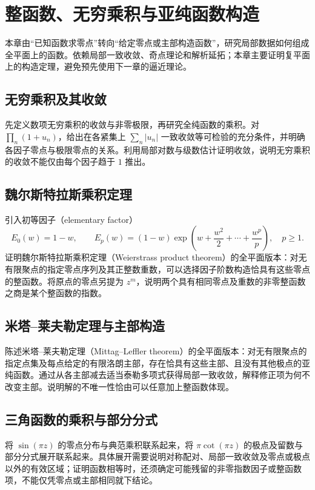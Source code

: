 \documentclass[UTF8,12pt,a4paper,fontset=fandol]{ctexbook}
\begin{document}
\chapter{整函数、无穷乘积与亚纯函数构造}
\label{chap:ca-entire}

本章由“已知函数求零点”转向“给定零点或主部构造函数”，研究局部数据如何组成全平面上的函数。依赖局部一致收敛、奇点理论和解析延拓；本章主要证明复平面上的构造定理，避免预先使用下一章的逼近理论。

\section{无穷乘积及其收敛}
先定义数项无穷乘积的收敛与非零极限，再研究全纯函数的乘积。对 $\prod_n(1+u_n)$，给出在各紧集上 $\sum_n|u_n|$ 一致收敛等可检验的充分条件，并明确各因子零点与极限零点的关系。利用局部对数与级数估计证明收敛，说明无穷乘积的收敛不能仅由每个因子趋于 $1$ 推出。

\section{魏尔斯特拉斯乘积定理}
引入初等因子（elementary factor）
\[
  E_0(w)=1-w,\qquad
  E_p(w)=(1-w)\exp\left(w+\frac{w^2}{2}+\cdots+\frac{w^p}{p}\right),
  \quad p\ge1.
\]
证明魏尔斯特拉斯乘积定理（Weierstrass product theorem）的全平面版本：对无有限聚点的指定零点序列及其正整数重数，可以选择因子阶数构造恰具有这些零点的整函数。将原点的零点另提为 $z^m$，说明两个具有相同零点及重数的非零整函数之商是某个整函数的指数。

\section{米塔--莱夫勒定理与主部构造}
陈述米塔--莱夫勒定理（Mittag--Leffler theorem）的全平面版本：对无有限聚点的指定点集及每点给定的有限洛朗主部，存在恰具有这些主部、且没有其他极点的亚纯函数。通过从各主部减去适当泰勒多项式获得局部一致收敛，解释修正项为何不改变主部。说明解的不唯一性恰由可以任意加上整函数体现。

\section{三角函数的乘积与部分分式}
将 $\sin(\pi z)$ 的零点分布与典范乘积联系起来，将 $\pi\cot(\pi z)$ 的极点及留数与部分分式展开联系起来。具体展开需要说明对称配对、局部一致收敛及零点或极点以外的有效区域；证明函数相等时，还须确定可能残留的非零指数因子或整函数项，不能仅凭零点或主部相同就下结论。
\end{document}
